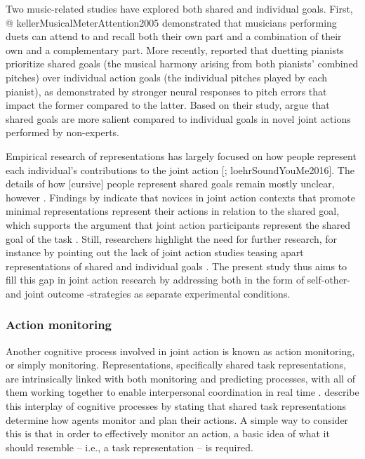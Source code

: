 \documentclass[10pt,a4paper,onecolumn]{article}
\begin{document}
Two music-related studies have explored both shared and individual goals. First, @ kellerMusicalMeterAttention2005 demonstrated that musicians performing duets can attend to and recall both their own part and a combination of their own and a complementary part. More recently, \textcite{loehrMonitoringIndividualJoint2013} reported that duetting pianists prioritize shared goals (the musical harmony arising from both pianists' combined pitches) over individual action goals (the individual pitches played by each pianist), as demonstrated by stronger neural responses to pitch errors that impact the former compared to the latter. Based on their study, \textcite{loehrSoundYouMe2016} argue that shared goals are more salient compared to individual goals in novel joint actions performed by non-experts.

Empirical research of representations has largely focused on how people represent each individual's contributions to the joint action {[}\textcite{knoblichPsychologicalResearchJoint2011}; loehrSoundYouMe2016{]}. The details of how {[}cursive{]} people represent shared goals remain mostly unclear, however \autocite{loehrSoundYouMe2016}. Findings by \textcite{loehrSoundYouMe2016} indicate that novices in joint action contexts that promote minimal representations represent their actions in relation to the shared goal, which supports the argument that joint action participants represent the shared goal of the task \autocite{vesperMinimalArchitectureJoint2010}. Still, researchers highlight the need for further research, for instance by pointing out the lack of joint action studies teasing apart representations of shared and individual goals \autocite{loehrSoundYouMe2016}. The present study thus aims to fill this gap in joint action research by addressing both in the form of self-other- and joint outcome -strategies as separate experimental conditions.

\hypertarget{action-monitoring}{%
\subsubsection{Action monitoring}\label{action-monitoring}}

Another cognitive process involved in joint action is known as action monitoring, or simply monitoring. Representations, specifically shared task representations, are intrinsically linked with both monitoring and predicting processes, with all of them working together to enable interpersonal coordination in real time \autocite{knoblichPsychologicalResearchJoint2011}. \textcite{knoblichPsychologicalResearchJoint2011} describe this interplay of cognitive processes by stating that shared task representations determine how agents monitor and plan their actions. A simple way to consider this is that in order to effectively monitor an action, a basic idea of what it should resemble -- i.e., a task representation -- is required.
\end{document}
